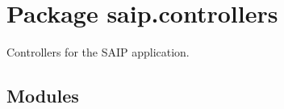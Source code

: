 %
%
%


\section{Package saip.controllers}

    \label{saip:controllers}
Controllers for the SAIP application.



\subsection{Modules}


